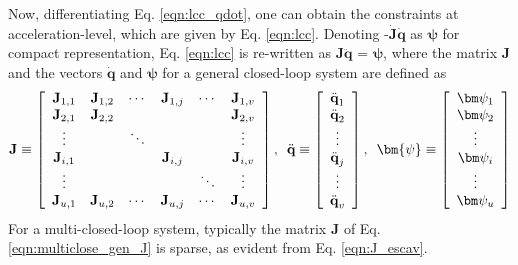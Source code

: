 {Now, differentiating Eq. \ref{eqn:lcc_qdot}, one can obtain the constraints at acceleration-level, which are given by Eq. \ref{eqn:lcc}. Denoting -\textbf{$\dot{\textbf{J}} \dot{\textbf{q}}$} as $\bm{\psi}$ for compact representation, Eq. \ref{eqn:lcc} is re-written as \textbf{J}$\ddot{\textbf{q}}$ = $\bm{\psi}$, where the matrix \textbf{J} and the vectors \textbf{$\dot{\textbf{q}}$} and $\bm{\psi}$ for a general closed-loop system are defined as 
	\begin{equation}
	\label{eqn:multiclose_gen_J}
	\textbf{J} \equiv
	\left[ \begin{array}{cccccc}
	\textbf{J$_{1,1}$} & \textbf{J$_{1,2}$} & \cdots & \textbf{J$_{1,j}$} & \cdots & \textbf{J$_{1,v}$} \\
	\textbf{J$_{2,1}$} & \textbf{J$_{2,2}$} & & & & \textbf{J$_{2,v}$} \\
	\vdots & & \ddots & & & \vdots \\
	\textbf{J$_{i,1}$} & & & \textbf{J$_{i,j}$} & & \textbf{J$_{i,v}$} \\
	\vdots & & & & \ddots & \vdots \\
	\textbf{J$_{u,1}$} & \textbf{J$_{u,2}$} & \cdots & \textbf{J$_{u,j}$} & \cdots & \textbf{J$_{u,v}$} \\
	\end{array} \right],\hspace*{5pt}
	\ddot{\textbf{q}} \equiv
	\left[ \begin{array}{c}
	\textbf{$\ddot{\textbf{q}}_{1}$}\\
	\textbf{$\ddot{\textbf{q}}_{2}$}\\
	\vdots\\
	\textbf{$\ddot{\textbf{q}}_{j}$}\\
	\vdots\\ 
	\textbf{$\ddot{\textbf{q}}_{v}$}\\
	\end{array} \right], \hspace*{5pt}
	\bm{\psi} \equiv
	\left[ \begin{array}{c}
	\mbox{$\bm\psi_1$}\\
	\mbox{$\bm\psi_2$}\\
	\vdots\\
	\mbox{$\bm\psi_i$}\\
	\vdots\\ 
	\mbox{$\bm\psi_u$}\\
	\end{array} \right] 
	\end{equation}
For a multi-closed-loop system, typically the matrix \textbf{J} of Eq. \ref{eqn:multiclose_gen_J} is sparse, as evident from Eq. \ref{eqn:J_escav}.

}
